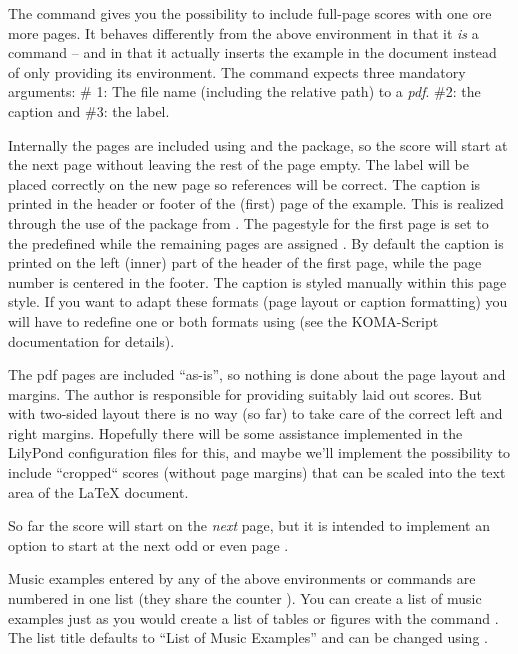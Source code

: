 \documentclass{OLLbook}
\begin{document}
The  command gives you the possibility to include full-page scores with one ore more pages.
It behaves differently from the above environment in that it \emph{is} a command -- and in that it actually inserts the example in the document instead of only providing its environment.
The command expects three mandatory arguments: 
\# 1: The file name (including the relative path) to a \emph{pdf}.
\#2: the caption and \#3: the label.

Internally the pages are included using  and the  package, so the score will start at the next page without leaving the rest of the page empty.
The label will be placed correctly on the new page so references will be correct.
The caption is printed in the header or footer of the (first) page of the example.
This is realized through the use of the  package from .
The pagestyle for the first page is set to the predefined  while the remaining pages are assigned .
By default the caption is printed on the left (inner) part of the header of the first page, while the page number is centered in the footer.
The caption is styled manually within this page style.
If you want to adapt these formats (page layout or caption formatting) you will have to redefine one or both formats using  (see the KOMA-Script documentation for details).
\begin{knownIssues}
The pdf pages are included “as-is”, so nothing is done about the page layout and margins.
The author is responsible for providing suitably laid out scores.
But with two-sided layout there is no way (so far) to take care of the correct left and right margins.
Hopefully there will be some assistance implemented in the LilyPond configuration files for this, and maybe we'll implement the possibility to include “cropped“ scores (without page margins) that can be scaled into the text area of the \LaTeX{} document.

So far the score will start on the \emph{next} page, but it is intended to implement an option to start at the next odd or even page .
\end{knownIssues}

\bigskip
Music examples entered by any of the above environments or commands are numbered in one list (they share the counter ).
You can create a list of music examples just as you would create a list of tables or figures with the command .
The list title defaults to “List of Music Examples” and can be changed using .
\end{document}
